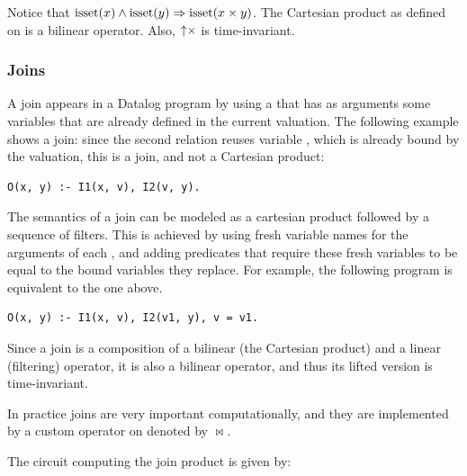 Notice that $\mbox{isset}(x) \land \mbox{isset}(y) \Rightarrow \mbox{isset}(x \times y)$.
The Cartesian product as defined on \zrs is a bilinear operator.  Also,
${\uparrow}\times$ is time-invariant.

\subsubsection{Joins}\label{sec:join}

A join appears in a Datalog program by using a 
that has as arguments some variables that are already defined in the current valuation.
The following example shows a join: since the second relation reuses variable ,
which is already bound by the valuation, this is a join, and not a Cartesian product:

\begin{lstlisting}[language=ddlog]
O(x, y) :- I1(x, v), I2(v, y).
\end{lstlisting}

The semantics of a join can be modeled as a cartesian product followed by a sequence of filters.
This is achieved by using fresh variable names for the arguments of each
, and adding predicates that require these fresh variables
to be equal to the bound variables they replace.
For example, the following program is equivalent to the one above.

\begin{lstlisting}[language=ddlog]
O(x, y) :- I1(x, v), I2(v1, y), v = v1.
\end{lstlisting}

Since a join is a composition of a bilinear (the Cartesian product) and a linear (filtering) operator, it is also a bilinear operator, and thus its lifted version is time-invariant.

In practice joins are very important computationally, and they are
implemented by a custom operator on \zrs denoted by $\bowtie$.

The circuit computing the join product is given by:


